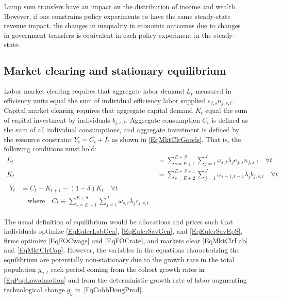 \documentclass[letterpaper,12pt]{article}
\theoremstyle{definition}
\begin{document}
\begin{spacing}{1.5}
    Lump sum transfers have an impact on the distribution of income and wealth. However, if one constrains policy experiments to have the same steady-state revenue impact, the changes in inequality in economic outcomes due to changes in government transfers is equivalent in each policy experiment in the steady-state.


  \subsection{Market clearing and stationary equilibrium}\label{SecMCEqlbm}

    Labor market clearing requires that aggregate labor demand $L_t$ measured in efficiency units equal the sum of individual efficiency labor supplied $e_{j,s}n_{j,s,t}$. Capital market clearing requires that aggregate capital demand $K_t$ equal the sum of capital investment by individuals $b_{j,s,t}$. Aggregate consumption $C_t$ is defined as the sum of all individual consumptions, and aggregate investment is defined by the resource constraint $Y_t = C_t + I_t$ as shown in \eqref{EqMktClrGoods}. That is, the following conditions must hold:
    \begin{align}
      L_t &= \sum_{s=E+1}^{E+S}\sum_{j=1}^{J} \omega_{s,t}\lambda_j e_{j,s}n_{j,s,t} \quad \forall t \label{EqMktClrLab} \\
      K_t &= \sum_{s=E+2}^{E+S+1}\sum_{j=1}^{J}\omega_{s-1,t-1}\lambda_j b_{j,s,t}  \quad \forall t \label{EqMktClrCap} \\
      \begin{split}
        Y_t &= C_t + K_{t+1} - (1-\delta)K_t \quad\forall t \\
        &\quad\text{where}\quad C_t \equiv \sum_{s=E+1}^{E+S}\sum_{j=1}^{J}\omega_{s,t}\lambda_j c_{j,s,t}
      \end{split} \label{EqMktClrGoods}
    \end{align}

    The usual definition of equilibrium would be allocations and prices such that individuals optimize \eqref{EqEulerLabGen}, \eqref{EqEulerSavGen}, and \eqref{EqEulerSavEpS}, firms optimize \eqref{EqFOCwage} and \eqref{EqFOCrate}, and markets clear \eqref{EqMktClrLab} and \eqref{EqMktClrCap}. However, the variables in the equations characterizing the equilibrium are potentially non-stationary due to the growth rate in the total population $g_{n,t}$ each period coming from the cohort growth rates in \eqref{EqPopLawofmotion} and from the deterministic growth rate of labor augmenting technological change $g_y$ in \eqref{EqCobbDougProd}.


\end{spacing}
\end{document}
